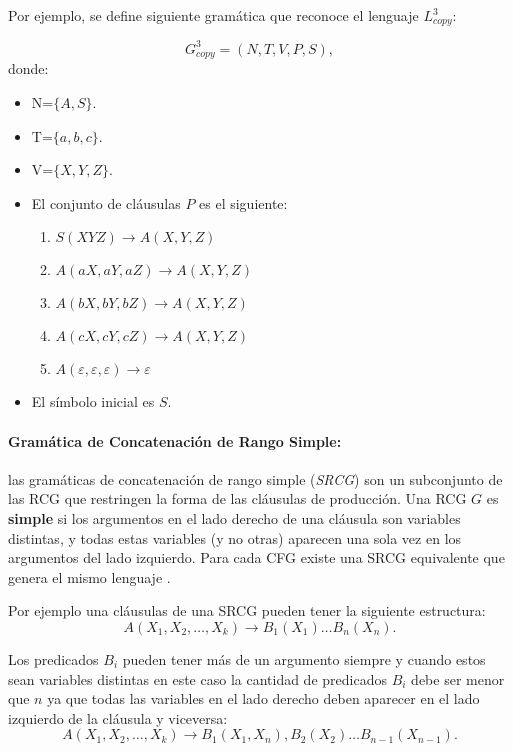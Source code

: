 Por ejemplo, se define siguiente gramática que reconoce el lenguaje $L^3_{copy}$:

\[
    G^3_{copy} = (N, T, V, P, S),
\]
donde:

\begin{itemize}
    \item  N=$\{A,S\}$.
    \item T=$\{a,b,c\}$.
    \item V=$\{X,Y,Z\}$.
    \item El conjunto de cláusulas $P$ es el siguiente:
          \begin{enumerate}
              \item $S(XYZ)\to A(X,Y,Z)$
              \item $A(aX,aY,aZ)\to A(X,Y,Z)$
              \item $A(bX,bY,bZ)\to A(X,Y,Z)$
              \item $A(cX,cY,cZ)\to A(X,Y,Z)$
              \item $A(\varepsilon,\varepsilon,\varepsilon)\to \varepsilon$
          \end{enumerate}
    \item El símbolo inicial es $S$.
\end{itemize}


\paragraph{Gramática de Concatenación de Rango Simple:} las gramáticas de concatenación de rango simple (\textit{SRCG}) son un subconjunto de las RCG que restringen la forma de las cláusulas de producción.
Una RCG $G$ es \textbf{simple} si los argumentos en el lado derecho de una cláusula son variables distintas, y todas estas variables (y no otras) aparecen una sola vez en los argumentos del lado izquierdo.
Para cada CFG existe una SRCG equivalente que genera el mismo lenguaje \cite{mainRCGBib}.

Por ejemplo una cláusulas de una SRCG pueden tener la siguiente estructura:
\[
    A(X_1, X_2, \ldots, X_k) \to B_1(X_1) \ldots B_n(X_n).
\]

Los predicados $B_i$ pueden tener más de un argumento siempre y cuando estos sean variables distintas en este caso la cantidad de predicados $B_i$ debe ser menor que $n$ ya que todas las variables en el lado derecho deben aparecer en el lado izquierdo de la cláusula y viceversa:
\[
    A(X_1, X_2, \ldots, X_k) \to B_1(X_1,X_n),B_2(X_2) \ldots B_{n-1}(X_{n-1}).
\]

